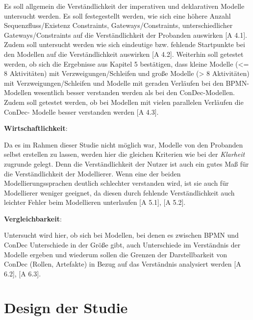 Es soll allgemein die Verständlichkeit der imperativen und deklarativen Modelle untersucht werden. Es soll festegestellt werden, wie sich eine höhere Anzahl Sequenzfluss/Existenz Constraints, Gateways/Constraints,  unterschiedlicher Gateways/Constraints auf die Verständlichkeit der Probanden auswirken [A 4.1].\newline
Zudem soll untersucht werden wie sich eindeutige bzw. fehlende Startpunkte bei den Modellen auf die Verständlichkeit auswirken [A 4.2].
Weiterhin soll getestet werden, ob sich die Ergebnisse aus Kapitel 5 bestätigen, dass kleine Modelle (<= 8 Aktivitäten) mit Verzweigungen/Schleifen und große Modelle (> 8 Aktivitäten) mit Verzweigungen/Schleifen und Modelle mit geraden Verläufen bei den BPMN-Modellen wesentlich besser verstanden werden als bei den ConDec-Modellen.\newline
Zudem soll getestet werden, ob bei Modellen mit vielen parallelen Verläufen die ConDec- Modelle besser verstanden werden [A 4.3].\newline

\textbf{Wirtschaftlichkeit}: 

Da es im Rahmen dieser Studie nicht möglich war, Modelle von den Probanden selbst erstellen zu lassen, werden hier die gleichen Kriterien wie bei der \textit{Klarheit} zugrunde gelegt. Denn die Verständlichkeit der Nutzer ist auch ein gutes Maß für die Verständlichkeit der Modellierer. Wenn eine der beiden Modellierungssprachen deutlich schlechter verstanden wird, ist sie auch für Modellierer weniger geeignet, da diesen durch fehlende Verständlichkeit auch leichter Fehler beim Modellieren unterlaufen [A 5.1], [A 5.2].\newline

\textbf{Vergleichbarkeit}: 

Untersucht wird hier, ob sich bei Modellen, bei denen es zwischen BPMN und ConDec Unterschiede in der Größe gibt, auch Unterschiede im Verständnis der Modelle ergeben und wiederum sollen die Grenzen der Darstellbarkeit von ConDec (Rollen, Artefakte) in Bezug auf das Verständnis analysiert werden [A 6.2], [A 6.3].\newline

\section{Design der Studie}

